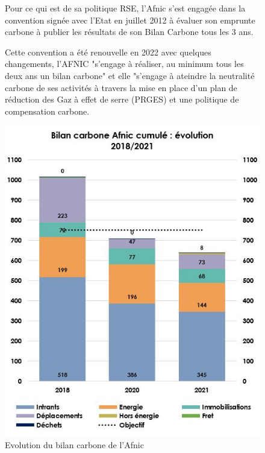 \begin{figure}[ht]
  \noindent
  \begin{minipage}{.6\textwidth}
Pour ce qui est de sa politique RSE, l’Afnic s’est engagée dans la convention signée avec l'Etat en juillet 2012 à évaluer son emprunte carbone à publier les résultats de son Bilan Carbone tous les 3 ans.
    
Cette convention a été renouvelle en 2022 avec quelques changements, l'AFNIC "s'engage à réaliser, au minimum tous les deux ans un bilan carbone" et elle "s'engage à ateindre la neutralité carbone de ses activités à travers la mise en place d'un plan de réduction des Gaz à effet de serre (PRGES) et une politique de compensation carbone.
\cite{conventionAfnic2022}
  \end{minipage}
  \hfill
  \begin{minipage}{.35\textwidth}
    \centering
      \includegraphics[width=\textwidth]{paper/figures/EvolutionCarbone}
      \caption{Evolution du bilan carbone de l'Afnic}
      \label{fig:evolutionCarbone}
  \end{minipage}
\end{figure}



